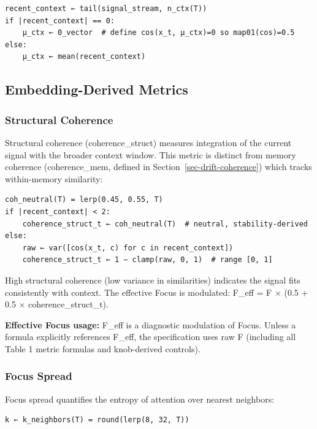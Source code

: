 \documentclass[
  letterpaper,
  DIV=11,
  numbers=noendperiod]{scrartcl}
\begin{document}
\begin{verbatim}
recent_context ← tail(signal_stream, n_ctx(T))
if |recent_context| == 0:
    μ_ctx ← 0_vector  # define cos(x_t, μ_ctx)=0 so map01(cos)=0.5
else:
    μ_ctx ← mean(recent_context)
\end{verbatim}

\subsection{Embedding-Derived Metrics}\label{embedding-derived-metrics}

\subsubsection{Structural Coherence}\label{sec-struct-coherence}

Structural coherence (coherence\_struct) measures integration of the
current signal with the broader context window. This metric is distinct
from memory coherence (coherence\_mem, defined in
Section~\ref{sec-drift-coherence}) which tracks within-memory
similarity:

\begin{verbatim}
coh_neutral(T) = lerp(0.45, 0.55, T)
if |recent_context| < 2:
    coherence_struct_t ← coh_neutral(T)  # neutral, stability-derived
else:
    raw ← var([cos(x_t, c) for c in recent_context])
    coherence_struct_t ← 1 − clamp(raw, 0, 1)  # range [0, 1]
\end{verbatim}

High structural coherence (low variance in similarities) indicates the
signal fits consistently with context. The effective Focus is modulated:
F\_eff = F × (0.5 + 0.5 × coherence\_struct\_t).

\textbf{Effective Focus usage:} F\_eff is a diagnostic modulation of
Focus. Unless a formula explicitly references F\_eff, the specification
uses raw F (including all Table 1 metric formulas and knob-derived
controls).

\subsubsection{Focus Spread}\label{sec-focus-spread}

Focus spread quantifies the entropy of attention over nearest neighbors:

\begin{verbatim}
k ← k_neighbors(T) = round(lerp(8, 32, T))
\end{verbatim}
\end{document}
